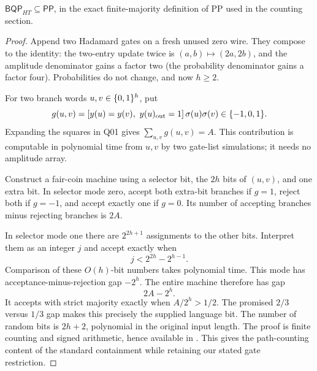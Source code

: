 \begin{theorem}\label{thm:Q03}
$\mathsf{BQP}_{HT}\subseteq\mathsf{PP}$, in the exact finite-majority definition of PP used in the counting section.
\end{theorem}
\begin{proof}
Append two Hadamard gates on a fresh unused zero wire. They compose to the identity: the two-entry update twice is $(a,b)\mapsto(2a,2b)$, and the amplitude denominator gains a factor two (the probability denominator gains a factor four). Probabilities do not change, and now $h\ge2$.

For two branch words $u,v\in\{0,1\}^h$, put
\[
 g(u,v)=[y(u)=y(v),\ y(u)_{\rm out}=1]\,\sigma(u)\sigma(v)
 \in\{-1,0,1\}.
\]
Expanding the squares in Q01 gives $\sum_{u,v}g(u,v)=A$. This contribution is computable in polynomial time from $u,v$ by two gate-list simulations; it needs no amplitude array.

Construct a fair-coin machine using a selector bit, the $2h$ bits of $(u,v)$, and one extra bit. In selector mode zero, accept both extra-bit branches if $g=1$, reject both if $g=-1$, and accept exactly one if $g=0$. Its number of accepting branches minus rejecting branches is $2A$.

In selector mode one there are $2^{2h+1}$ assignments to the other bits. Interpret them as an integer $j$ and accept exactly when
\[
 j<2^{2h}-2^{h-1}.
\]
Comparison of these $O(h)$-bit numbers takes polynomial time. This mode has acceptance-minus-rejection gap $-2^h$. The entire machine therefore has gap
\[
 2A-2^h.
\]
It accepts with strict majority exactly when $A/2^h>1/2$. The promised $2/3$ versus $1/3$ gap makes this precisely the supplied language bit. The number of random bits is $2h+2$, polynomial in the original input length. The proof is finite counting and signed arithmetic, hence available in \ipra. This gives the path-counting content of the standard containment while retaining our stated gate restriction.
\end{proof}

